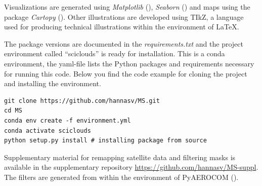 Visualizations are generated using \textit{Matplotlib} (\cite{matplotlib}),  \textit{Seaborn} (\cite{seaborn}) and maps using the package \textit{Cartopy} (\cite{Cartopy}). Other illustrations are developed using TIkZ, a language used for producing technical illustrations within the environment of LaTeX.

The package versions are documented in the \textit{requirements.txt} and the project environment called ``sciclouds'' is ready for installation. This is a conda environment, the yaml-file lists the Python packages and requirements necessary for running this code. Below you find the code example for cloning the project and installing the environment.

\begin{verbatim}
git clone https://github.com/hannasv/MS.git
cd MS
conda env create -f environment.yml
conda activate sciclouds
python setup.py install # installing package from source
\end{verbatim}

Supplementary material for remapping satellite data and filtering masks is available in the supplementary repository \href{https://github.com/hannasv/MS-suppl}{https://github.com/hannasv/MS-suppl}. %
The filters are generated from within the environment of PyAEROCOM (\cite{pyaerocom}). 



